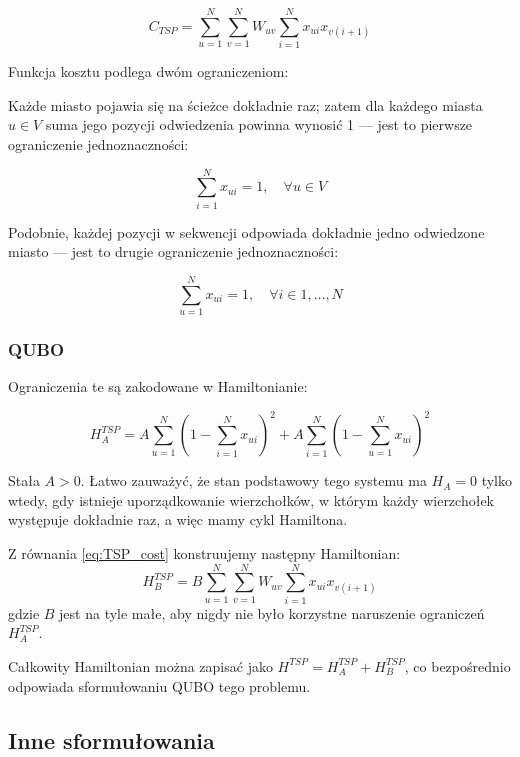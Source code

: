 \begin{equation}
C_{TSP} = \sum_{u=1}^N \sum_{v=1}^N W_{uv} \sum_{i=1}^N x_{ui} x_{v(i+1)}
\label{eq:TSP_cost}
\end{equation}

Funkcja kosztu podlega dwóm ograniczeniom:

Każde miasto pojawia się na ścieżce dokładnie raz; zatem dla każdego miasta $u \in V$ suma jego pozycji odwiedzenia powinna wynosić 1 — jest to pierwsze ograniczenie jednoznaczności:

\begin{equation}
\sum_{i=1}^{N} x_{ui} = 1, \quad \forall u \in V
\label{eq:TSP_constraint1}
\end{equation}

Podobnie, każdej pozycji w sekwencji odpowiada dokładnie jedno odwiedzone miasto — jest to drugie ograniczenie jednoznaczności:

\begin{equation}
\sum_{u=1}^{N} x_{ui} = 1, \quad \forall i \in {1, \ldots, N}
\label{eq:TSP_constraint2}
\end{equation}

\subsubsection*{QUBO}
Ograniczenia te są zakodowane w Hamiltonianie:

\begin{equation}
H_A^{TSP} = A \sum_{u=1}^N (1 - \sum_{i=1}^N x_{ui})^2 + A \sum_{i=1}^N (1 - \sum_{u=1}^N x_{ui})^2
\end{equation}

Stała $A > 0$. Łatwo zauważyć, że stan podstawowy tego systemu ma $H_A = 0$ tylko wtedy, gdy istnieje uporządkowanie wierzchołków, w którym każdy wierzchołek występuje dokładnie raz, a więc mamy cykl Hamiltona.

Z równania \ref{eq:TSP_cost} konstruujemy następny Hamiltonian:
\begin{equation}
H_B^{TSP} = B\sum_{u=1}^N \sum_{v=1}^N W_{uv} \sum_{i=1}^N x_{ui} x_{v(i+1)}
\end{equation}
gdzie $B$ jest na tyle małe, aby nigdy nie było korzystne naruszenie ograniczeń $H_A^{TSP}$.

Całkowity Hamiltonian można zapisać jako $H^{TSP} = H_A^{TSP} + H_B^{TSP}$, co bezpośrednio odpowiada sformułowaniu QUBO tego problemu.

\subsection{Inne sformułowania}

